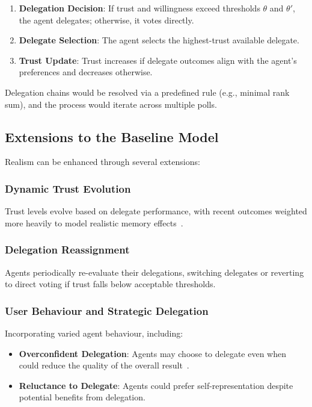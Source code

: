 \begin{enumerate}
    \item \textbf{Delegation Decision}: If trust and willingness exceed thresholds $\theta$ and $\theta'$, the agent delegates; otherwise, it votes directly.
    \item \textbf{Delegate Selection}: The agent selects the highest-trust available delegate.
    \item \textbf{Trust Update}: Trust increases if delegate outcomes align with the agent's preferences and decreases otherwise.
\end{enumerate}

Delegation chains would be resolved via a predefined rule (e.g., minimal rank sum), and the process would iterate across multiple polls.

\subsection{Extensions to the Baseline Model}

Realism can be enhanced through several extensions:

\subsubsection{Dynamic Trust Evolution}

Trust levels evolve based on delegate performance, with recent outcomes weighted more heavily to model realistic memory effects~\citep{casella_2022}.

\subsubsection{Delegation Reassignment}

Agents periodically re-evaluate their delegations, switching delegates or reverting to direct voting if trust falls below acceptable thresholds.

\subsubsection{User Behaviour and Strategic Delegation}

Incorporating varied agent behaviour, including:

\begin{itemize}
    \item \textbf{Overconfident Delegation}: Agents may choose to delegate even when could reduce the quality of the overall result~\citep{casella_2022}.
    \item \textbf{Reluctance to Delegate}: Agents could prefer self-representation despite potential benefits from delegation.
\end{itemize}

